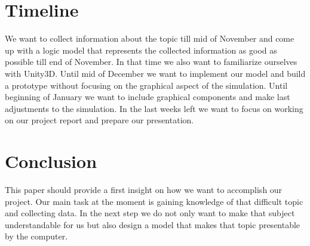 \documentclass{acm_proc_article-sp}
\begin{document}
\section{Timeline}
We want to collect information about the topic till mid of November and come up with a logic model that represents the collected information as good as possible till end of November. In that time we also want to familiarize ourselves with Unity3D. Until mid of  December we want to implement our model and build a prototype without focusing on the graphical aspect of the simulation.  Until beginning of January we want to include graphical components and make last adjustments to the simulation. In the last weeks left we want to focus on working on our project report and prepare our presentation.

\section{Conclusion}
This paper should provide a first insight on how we want to accomplish our project. Our main task at the moment is gaining knowledge of that difficult topic and collecting data. In the next step we do not only want to make that subject understandable for us but also design a model that makes that topic 	presentable by the computer. 


 
\end{document}
